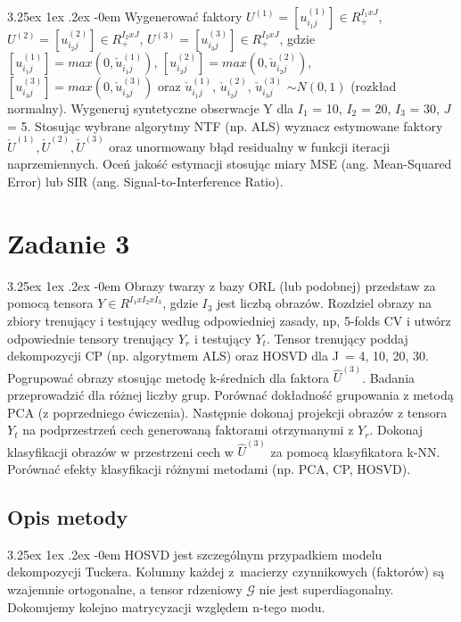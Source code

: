 \documentclass[11pt, a4paper]{article}
\makeatletter
\renewcommand\paragraph{\@startsection{paragraph}{5}{\z@}
  {3.25ex \@plus1ex \@minus.2ex}
  {-0em}
  {\normalfont\normalsize\bfseries}}
\makeatother
\begin{document}
\paragraph{}
Wygenerować faktory 
$U^(1) = [u^{(1)}_{i_1j}] \in R_+^{I_1xJ}$,
 $U^(2) = [u^{(2)}_{i_2j}] \in R_+^{I_2xJ}$,
  $U^(3) = [u^{(3)}_{i_3j}] \in R_+^{I_3xJ}$,
  gdzie 
  $[u^{(1)}_{i_1j}] = max(0, \check{u}^{(1)}_{i_1j})$,
  $[u^{(2)}_{i_2j}] = max(0, \check{u}^{(2)}_{i_2j})$,
  $[u^{(3)}_{i_3j}] = max(0, \check{u}^{(3)}_{i_3j})$
  oraz
  $\check{u}^{(1)}_{i_1j}$,
  $\check{u}^{(2)}_{i_2j}$,
  $\check{u}^{(3)}_{i_3j}$
  $\sim N(0,1)$ (rozkład normalny). 
  Wygeneruj syntetyczne obserwacje Y dla 
  $I_1$ = 10, 
  $I_2$ = 20, 
  $I_3$ = 30, 
  $J$ = 5. 
  Stosując wybrane algorytmy NTF (np. ALS) wyznacz estymowane faktory $\check{U}^{(1)}, \check{U}^{(2)}, \check{U}^{(3)}$ oraz unormowany błąd residualny w funkcji iteracji naprzemiennych. Oceń jakość estymacji stosując miary MSE (ang. Mean-Squared Error) lub SIR (ang. Signal-to-Interference Ratio).

\section{Zadanie 3}
\paragraph{}
Obrazy twarzy z bazy ORL (lub podobnej) przedstaw za pomocą tensora $Y \in R^{I_1xI_2xI_3}$, gdzie $I_3$ jest liczbą obrazów. Rozdziel obrazy na zbiory trenujący i testujący według odpowiedniej zasady, np, 5-folds CV i utwórz odpowiednie tensory trenujący $Y_r$ i testujący $Y_t$. Tensor trenujący poddaj dekompozycji CP (np. algorytmem ALS) oraz HOSVD dla J~= 4, 10, 20, 30. Pogrupować obrazy stosując metodę k-średnich dla faktora $\widehat{U}^{(3)}$. Badania przeprowadzić dla różnej liczby grup. Porównać dokładność grupowania z metodą PCA (z poprzedniego ćwiczenia). Następnie dokonaj projekcji obrazów z tensora $Y_t$ na podprzestrzeń cech generowaną faktorami otrzymanymi z $Y_r$. Dokonaj klasyfikacji obrazów w przestrzeni cech w $\widehat{U}^{(3)}$ za pomocą klasyfikatora k-NN. Porównać efekty klasyfikacji różnymi metodami (np. PCA, CP, HOSVD).

\subsection{Opis metody}
\paragraph{}
HOSVD jest szczególnym przypadkiem modelu dekompozycji Tuckera. Kolumny każdej z~macierzy czynnikowych (faktorów) są wzajemnie ortogonalne, a tensor rdzeniowy $\mathcal {G}$ nie jest superdiagonalny. Dokonujemy kolejno matrycyzacji względem n-tego modu. 
\end{document}

